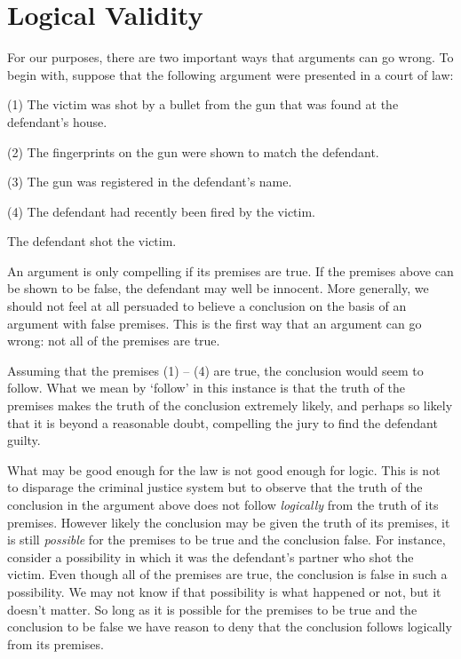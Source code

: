 \section{Logical Validity}
  \label{sec:validity}

For our purposes, there are two important ways that arguments can go wrong.
To begin with, suppose that the following argument were presented in a court of law:

\begin{earg}
  \item[(1)] The victim was shot by a bullet from the gun that was found at the defendant's house.
  \item[(2)] The fingerprints on the gun were shown to match the defendant.
  \item[(3)] The gun was registered in the defendant's name.
  \item[(4)] The defendant had recently been fired by the victim.
  \item[\therefore] The defendant shot the victim.
\end{earg}

An argument is only compelling if its premises are true.
If the premises above can be shown to be false, the defendant may well be innocent.
More generally, we should not feel at all persuaded to believe a conclusion on the basis of an argument with false premises. 
This is the first way that an argument can go wrong: not all of the premises are true.

Assuming that the premises (1) -- (4) are true, the conclusion would seem to follow.
What we mean by `follow' in this instance is that the truth of the premises makes the truth of the conclusion extremely likely, and perhaps so likely that it is beyond a reasonable doubt, compelling the jury to find the defendant guilty.

What may be good enough for the law is not good enough for logic.
This is not to disparage the criminal justice system but to observe that the truth of the conclusion in the argument above does not follow \textit{logically} from the truth of its premises.
However likely the conclusion may be given the truth of its premises, it is still \textit{possible} for the premises to be true and the conclusion false.
For instance, consider a possibility in which it was the defendant's partner who shot the victim.
Even though all of the premises are true, the conclusion is false in such a possibility.
We may not know if that possibility is what happened or not, but it doesn't matter.
So long as it is possible for the premises to be true and the conclusion to be false we have reason to deny that the conclusion follows logically from its premises.

